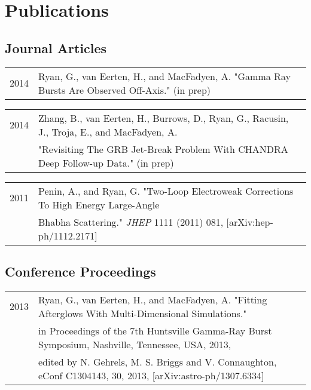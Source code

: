\documentclass[letterpaper]{article}
\renewenvironment{itemize}{
  \begin{list}{}{
    \setlength{\leftmargin}{-0.5em}
  }
}{
  \end{list}
}
\begin{document}
\section*{Publications}
\subsection*{Journal Articles}
\begin{itemize}
\item \begin{tabular}{ll}
2014 & Ryan, G., van Eerten, H., and MacFadyen, A. "Gamma Ray Bursts Are Observed Off-Axis."  (in prep) \\
\end{tabular}

\item \begin{tabular}{ll}
2014 & Zhang, B., van Eerten, H., Burrows, D., Ryan, G., Racusin, J., Troja, E., and MacFadyen, A. \\ & "Revisiting The GRB Jet-Break Problem With CHANDRA Deep Follow-up Data."  (in prep) \\
\end{tabular}

\item \begin{tabular}{ll}
2011 & Penin, A., and Ryan, G.  "Two-Loop Electroweak Corrections To High Energy Large-Angle \\& Bhabha Scattering." \emph{JHEP} 1111 (2011) 081, [arXiv:hep-ph/1112.2171] \\
\end{tabular}
\end{itemize}

\subsection*{Conference Proceedings}
\begin{itemize}
\item \begin{tabular}{ll}
2013 & Ryan, G., van Eerten, H., and MacFadyen, A. "Fitting Afterglows With Multi-Dimensional Simulations." \\& in Proceedings of the 7th Huntsville Gamma-Ray Burst Symposium, Nashville, Tennessee, USA, 2013, \\& edited by N. Gehrels, M. S. Briggs and V. Connaughton, eConf C1304143, 30, 2013, [arXiv:astro-ph/1307.6334] \\
\end{tabular}
\end{itemize}
\end{document}
